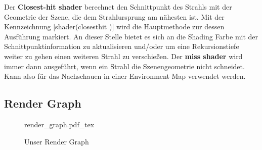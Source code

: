 Der \textbf{Closest-hit shader} berechnet den Schnittpunkt des Strahls mit der Geometrie
der Szene, die dem Strahlursprung am nähesten ist.
Mit der Kennzeichnung [shader(\dq closesthit \dq)] wird die Hauptmethode zur 
dessen Ausführung markiert. An dieser Stelle bietet es sich an die Shading Farbe 
mit der Schnittpunktinformation zu aktualisieren und/oder um eine Rekursionstiefe weiter 
zu gehen einen weiteren Strahl zu verschießen. 
Der \textbf{miss shader} wird immer dann ausgeführt, wenn ein Strahl die
Szenengeometrie nicht schneidet. Kann also für das Nachschauen in einer 
Environment Map verwendet werden. 

\subsection{Render Graph}

\begin{figure}[H]
    \centering
    \def\svgwidth{\columnwidth}
    {render_graph.pdf_tex}
    \caption{Unser Render Graph}
    \label{pic:Render Graph}
\end{figure}






